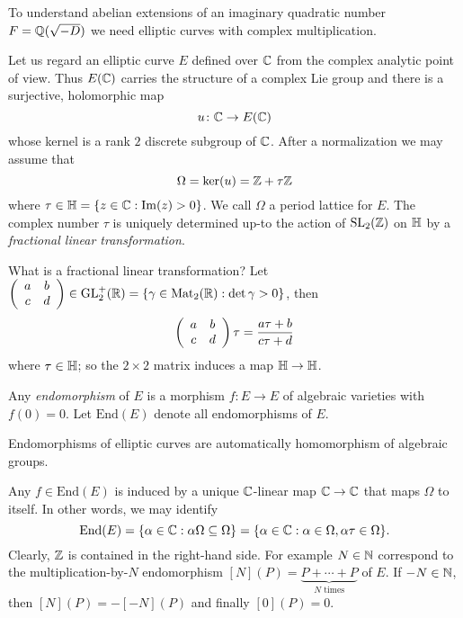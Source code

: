 To understand abelian extensions of an imaginary quadratic number
$F={\mathbb{Q}}(\sqrt{-D})$ we need elliptic curves with complex
multiplication.

Let us regard an elliptic curve $E$ defined over ${\mathbb{C}}$ from the
complex analytic point of view. Thus $E({\mathbb{C}})$ carries the structure of
a complex Lie group and there is a surjective, holomorphic map
\begin{equation*}
  u \colon {\mathbb{C}} \rightarrow E({\mathbb{C}})
\end{equation*}
whose kernel is a rank $2$ discrete subgroup of ${\mathbb{C}}$.
After a normalization we may assume that
\begin{equation*}
  \Omega = \mathrm{ker}(u) = {\mathbb{Z}}+\tau{\mathbb{Z}}
\end{equation*}
where $\tau\in {\mathbb{H}} = \{z\in {\mathbb{C}} : \mathrm{Im}(z)>0\}$. We call
$\Omega$ a period lattice for $E$.
The complex number $\tau$ is uniquely determined up-to the action of
$\mathrm{SL}_2({\mathbb{Z}})$ on ${\mathbb{H}}$ by a \emph{fractional linear transformation}.

What is a fractional linear transformation?
Let $\left( \begin{array}{cc} {a} & {b} \\ {c} & {d} \end{array} \right)\in\mathrm{GL}^+_2({\mathbb{R}}) = \{\gamma \in
\mathrm{Mat}_2({\mathbb{R}}) : \det \gamma > 0\}$, then
\begin{equation*}
  \left( \begin{array}{cc} {a} & {b} \\ {c} & {d} \end{array} \right) \tau = \frac{a\tau+b}{c\tau +d}
\end{equation*}
where $\tau\in{\mathbb{H}}$; so the $2\times 2$ matrix induces a map ${\mathbb{H}}\rightarrow{\mathbb{H}}$.

\begin{definition}
  Any \emph{endomorphism} of $E$ is a morphism $f\colon E\rightarrow E$ of
  algebraic varieties with $f(0)=0$. Let $\mathrm{End}(E)$ denote all
  endomorphisms of $E$.   
\end{definition}

Endomorphisms of elliptic curves are automatically homomorphism of
algebraic groups. 

Any $f\in \mathrm{End}(E)$ is
induced by a unique ${\mathbb{C}}$-linear map
${\mathbb{C}}\rightarrow {\mathbb{C}}$ that maps $\Omega$ to itself. In other words, we
may identify
\begin{equation*}
  \mathrm{End}(E) = \{ \alpha\in{\mathbb{C}} : \alpha \Omega \subseteq \Omega \}
  = \{\alpha\in {\mathbb{C}} : \alpha\in \Omega, \alpha\tau\in \Omega\}. 
\end{equation*}
Clearly,  ${\mathbb{Z}}$ is contained in the right-hand side. For example  $N\in{\mathbb{N}}$
correspond to the multiplication-by-$N$ endomorphism $[N](P) =
\underbrace{P+\cdots +P}_{N\text{ times}}$ of $E$.
If $-N\in{\mathbb{N}}$, then $[N](P) = -[-N](P)$ and finally $[0](P)=0$.  

